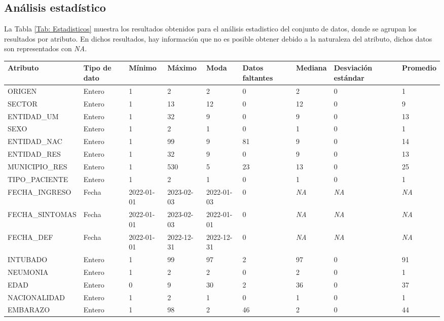 \subsection{Análisis estadístico}
La Tabla \ref{Tab: Estadisticos} muestra los resultados obtenidos para el análisis estadistico del conjunto de datos, donde se agrupan los resultados por atributo. En dichos resultados, hay información que no es posible obtener debido a la naturaleza del atributo, dichos datos son representados con \emph{NA}.

\begin{table}[htbp]
\centering
\scriptsize
\begin{tabular}{|p{4.5cm}|p{1.0cm}|p{1.5cm}|p{1.5cm}|p{1.5cm}|p{1.2cm}|p{1.0cm}|p{1.3cm}|p{1.1cm}|}
\hline
Atributo & Tipo de dato & Mínimo & Máximo & Moda & Datos faltantes & Mediana & Desviación estándar & Promedio \\
\hline
ORIGEN & Entero & 1 & 2 & 2 & 0 & 2 & 0 & 1 \\
\hline
SECTOR & Entero & 1 & 13 & 12 & 0 & 12 & 0 & 9 \\
\hline
ENTIDAD\_UM & Entero & 1 & 32 & 9 & 0 & 9 & 0 & 13 \\
\hline
SEXO & Entero & 1 & 2 & 1 & 0 & 1 & 0 & 1 \\
\hline
ENTIDAD\_NAC & Entero & 1 & 99 & 9 & 81 & 9 & 0 & 14 \\
\hline
ENTIDAD\_RES & Entero & 1 & 32 & 9 & 0 & 9 & 0 & 13 \\
\hline
MUNICIPIO\_RES & Entero & 1 & 530 & 5 & 23 & 13 & 0 & 25 \\
\hline
TIPO\_PACIENTE & Entero & 1 & 2 & 1 & 0 & 1 & 0 & 1 \\
\hline
FECHA\_INGRESO & Fecha & 2022-01-01 & 2023-02-03 & 2022-01-03 & 0 & \emph{NA} & \emph{NA} & \emph{NA} \\
\hline
FECHA\_SINTOMAS & Fecha & 2022-01-01 & 2023-02-03 & 2022-01-01 & 0 & \emph{NA} & \emph{NA} & \emph{NA} \\
\hline
FECHA\_DEF & Fecha & 2022-01-01 & 2022-12-31 & 2022-12-31 & 0 & \emph{NA} & \emph{NA} & \emph{NA} \\
\hline
INTUBADO & Entero & 1 & 99 & 97 & 2 & 97 & 0 & 91 \\
\hline
NEUMONIA & Entero & 1 & 2 & 2 & 0 & 2 & 0 & 1 \\
\hline
EDAD & Entero & 0 & 9 & 30 & 2 & 36 & 0 & 37 \\
\hline
NACIONALIDAD & Entero & 1 & 2 & 1 & 0 & 1 & 0 & 1 \\
\hline
EMBARAZO & Entero & 1 & 98 & 2 & 46 & 2 & 0 & 44 \\

\end{tabular}
\end{table}
